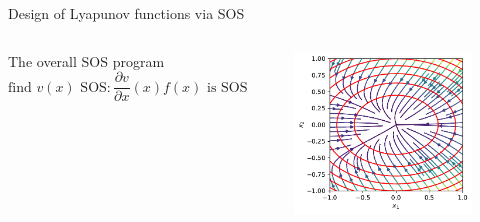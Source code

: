 \documentclass[aspectratio=169]{beamer}
\begin{document}
\begin{frame}{Design of Lyapunov functions via SOS
\href{https://colab.research.google.com/github/TobiaMarcucci/optimal_control_pisa/blob/master/demos/lyapunov_poly.ipynb}{}}
\begin{columns}
\begin{block}{The overall SOS program}
$$
\text{find } v(x) \text{ SOS} : \frac{\partial v}{\partial x}(x) f(x) \text{ is SOS}
$$
\end{block}
\begin{figure}
\includegraphics[width=\columnwidth]{figures/lyapunov_poly_1.pdf}

\end{figure}
\end{columns}
\end{frame}
\end{document}
